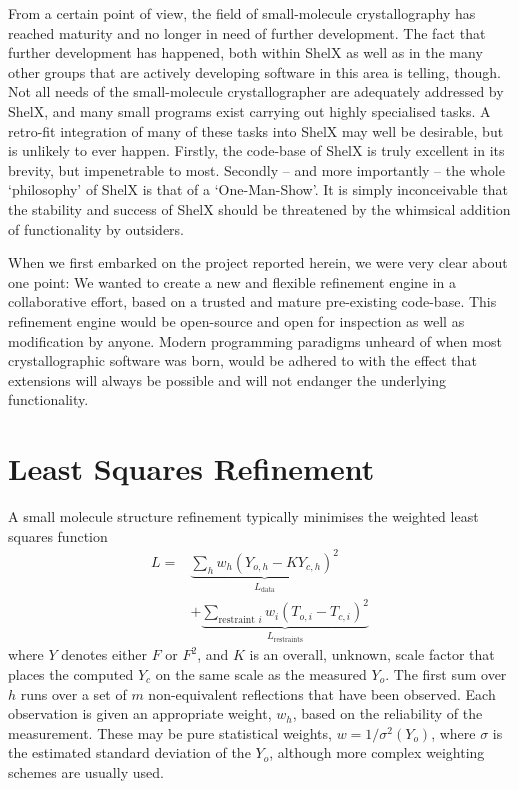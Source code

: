 \documentclass[pdf]{iucr}
\begin{document}
From a certain point of view, the field of small-molecule crystallography has reached maturity and no longer in need of further development. The fact that further development has happened, both within ShelX as well as in the many other groups that are actively developing software in this area is telling, though. Not all needs of the small-molecule crystallographer are adequately addressed by ShelX, and many small programs exist carrying out highly specialised tasks. A retro-fit integration of many of these tasks into ShelX may well be desirable, but is unlikely to ever happen. Firstly, the code-base of ShelX is truly excellent in its brevity, but impenetrable to most. Secondly -- and more importantly -- the whole `philosophy' of ShelX is that of a `One-Man-Show'.  It is simply inconceivable that the stability and success of ShelX should be threatened by the whimsical addition of functionality by outsiders.

When we first embarked on the project reported herein, we were very clear about one point: We wanted to create a new and flexible refinement engine in a collaborative effort, based on a trusted and mature pre-existing code-base. This refinement engine would be open-source and open for inspection as well as modification by anyone. Modern programming paradigms unheard of when most crystallographic software was born, would be adhered to with the effect that extensions will always be possible and will not endanger the underlying functionality.


\section{Least Squares Refinement}

A small molecule structure refinement typically minimises the weighted least squares function
\begin{equation}
\begin{split}
L = &\underbrace{\sum_h w_h \left( Y_{o,h} - K Y_{c,h} \right)^2}_{L_\text{data}} \\
  &+ \underbrace{\sum_{\text{restraint } i} w_i \left( T_{o,i} - T_{c,i} \right)^2}_{L_\text{restraints}}
\label{eqn:L:def}
\end{split}
\end{equation}
where $Y$ denotes either $F$ or $F^2$, and $K$ is an overall, unknown, scale factor that places the computed $Y_c$ on the same scale as the measured $Y_o$. The first sum over $h$ runs over a set of $m$ non-equivalent reflections that have been observed. Each observation is given an appropriate weight, $w_h$, based on the reliability of the measurement. These may be pure statistical weights, $w = 1/\sigma^2(Y_o)$, where $\sigma$ is the estimated standard deviation of the $Y_o$, although more complex weighting schemes are usually used.
\end{document}
